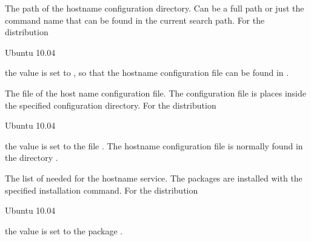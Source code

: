 
The path of the hostname configuration directory. Can be a full path or
just the command name that can be found in the current search path.
For the distribution
\begin{inparaitem}
\item[\TheDistribution{ubuntu}] Ubuntu 10.04
\end{inparaitem}
the value is set to , so that the hostname configuration
file can be found in .


The file  of the host name configuration file. The configuration file
is places inside the specified configuration directory.
For the distribution
\begin{inparaitem}
\item[\TheDistribution{ubuntu}] Ubuntu 10.04
\end{inparaitem}
the value is set to the file . The hostname configuration
file is normally found in the directory .


The list of  needed for the hostname service. The packages
are installed with the specified installation command.
For the distribution
\begin{inparaitem}
\item[\TheDistribution{ubuntu}] Ubuntu 10.04
\end{inparaitem}
the value is set to the package .

